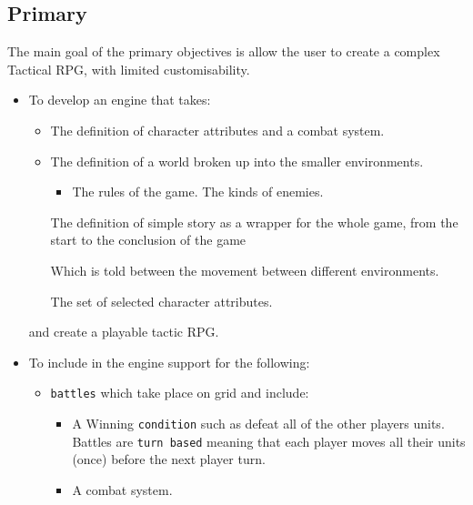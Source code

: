 \subsection{Primary}
\label{primary}
The main goal of the primary objectives is allow the user to create a complex Tactical RPG, with limited customisability.  
\begin{itemize}
\item To develop an engine that takes:
\begin{itemize}

 \item The definition of character attributes and a combat system.
	\item The definition of a world broken up into the smaller environments.
	\begin{itemize}
		\item The rules of the game.
		\cross The kinds of enemies.
	\end{itemize}
	
	\tick The definition of simple story as a wrapper for the whole game, from the start to the conclusion of the game
	\begin{itemize}
		\cross Which is told between the movement between different environments.
	\end{itemize}
	                        
	\cross The set of selected character attributes.
	
\end{itemize}
and create a playable tactic RPG.

\item To include in the engine support for the following:
\begin{itemize}
	\tick \texttt{units} with a fixed set of associated attributes such as:
	\begin{itemize}
		\tick Hit-points (which represent the health of the unit).
		\tick Strength.
		\tick Defence.
		\tick Move (The number of tiles the unit can move each turn).
	\end{itemize}
	
	\item \texttt{battles} which take place on grid and include:
	\begin{itemize}
		\tick  A set number of \texttt{units} for each player.
		\item A Winning \texttt{condition} such as defeat all of the other players units.
		\tick  Battles are \texttt{turn based} meaning that each player moves all their units (once) before the next player turn.   
		\item A combat system.
	\end{itemize}
	

\end{itemize}
\end{itemize}
